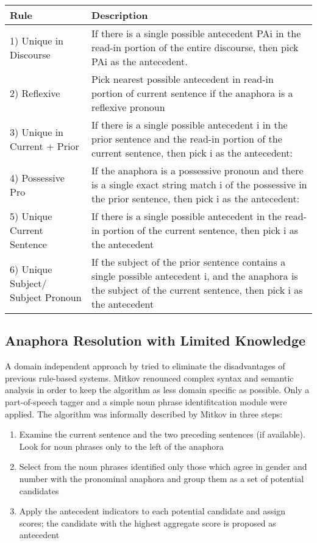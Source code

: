 \begin{center}
    \begin{tabular}{| l |p{8cm} |}

    \hline

    Rule & Description \\ \hline
\hline
    1) Unique in Discourse & If there is a single possible antecedent PAi in the read-in portion of the entire discourse, then pick PAi as the antecedent. \\ \hline
    2) Reflexive & Pick nearest possible antecedent in read-in portion of current sentence if the anaphora is a reflexive pronoun \\ \hline
    3) Unique in Current + Prior & If there is a single possible antecedent i in the prior sentence and the read-in portion of the current sentence, then pick i as the antecedent: \\ \hline
    4) Possessive Pro & If the anaphora is a possessive pronoun and there is a single exact string match i of the possessive in the prior sentence, then pick i as the antecedent:  \\ \hline
    5) Unique Current Sentence & If there is a single possible antecedent in the read-in portion of the current sentence, then pick i as the antecedent  \\ \hline
    6) Unique Subject/ Subject Pronoun & If the subject of the prior sentence contains a single possible antecedent i, and the anaphora is the subject of the current sentence, then pick i as the antecedent \\ \hline

    \end{tabular}
     \label{table:cogniacRules}
\end{center}

\subsection{Anaphora Resolution with Limited Knowledge}
\label{anaphoraLimitedKnowledgeSection}

A domain independent approach by \cite{mitkov1998robust} tried to eliminate the disadvantages of previous rule-based systems. Mitkov renounced complex syntax and semantic analysis in order to keep the algorithm as less domain specific as possible. Only a part-of-speech tagger and a simple noun phrase identifitcation module were applied. The algorithm was informally described by Mitkov in three steps:
\begin{enumerate} 
\item Examine the current sentence and the two preceding sentences (if available). Look for noun phrases only to the left of the anaphora
\item Select from the noun phrases identified only those which agree in gender and number with the pronominal anaphora and group them as a set of potential candidates
\item Apply the antecedent indicators to each potential candidate and assign scores; the candidate with the highest aggregate score is proposed as antecedent
\end{enumerate}

